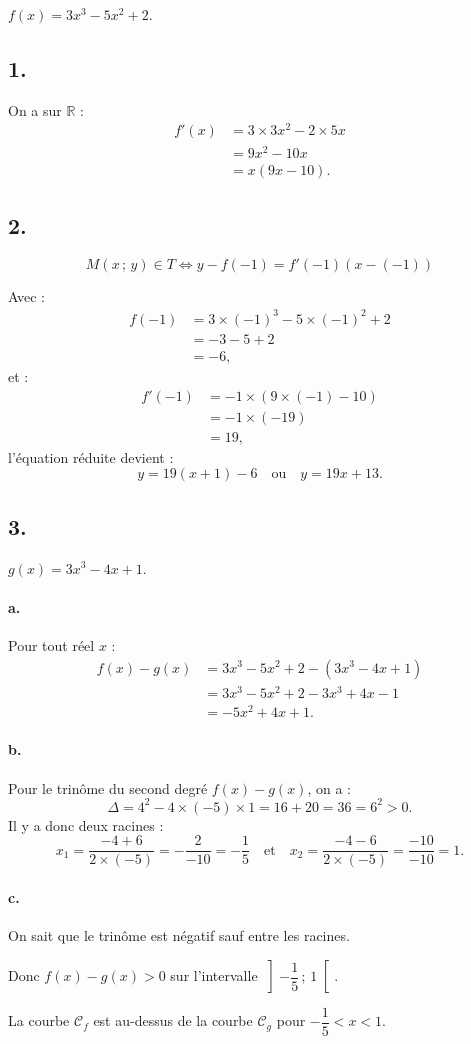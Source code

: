 \( f(x) = 3x^3 - 5x^2 + 2 \).

\subsection*{1.}

On a sur \( \mathbb{R} \) :
\begin{align*}
f'(x) &= 3 \times 3x^2 - 2 \times 5x \\
&= 9x^2 - 10x \\
&= x(9x - 10).
\end{align*}

\subsection*{2.}

\[
M(x \,;\, y) \in T \iff y - f(-1) = f'(-1)(x - (-1))
\]

Avec :
\begin{align*}
f(-1) &= 3 \times (-1)^3 - 5 \times (-1)^2 + 2 \\
&= -3 - 5 + 2 \\
&= -6, 
\end{align*}
et :
\begin{align*}
f'(-1) &= -1 \times (9 \times (-1) - 10) \\
&= -1 \times (-19) \\
&= 19,
\end{align*}
l'équation réduite devient :
\[
y = 19(x + 1) - 6 \quad \text{ou} \quad y = 19x + 13.
\]

\subsection*{3.}

\( g(x) = 3x^3 - 4x + 1 \).

\paragraph{a.} Pour tout réel \(x\) :
\begin{align*}
f(x) - g(x) &= 3x^3 - 5x^2 + 2 - (3x^3 - 4x + 1) \\
&= 3x^3 - 5x^2 + 2 - 3x^3 + 4x - 1 \\
&= -5x^2 + 4x + 1.
\end{align*}

\paragraph{b.} Pour le trinôme du second degré \( f(x) - g(x) \), on a :
\[
\Delta = 4^2 - 4 \times (-5) \times 1 = 16 + 20 = 36 = 6^2 > 0.
\]
Il y a donc deux racines :
\[
x_1 = \dfrac{-4 + 6}{2 \times (-5)} = -\dfrac{2}{-10} = -\dfrac{1}{5} \quad \text{et} \quad x_2  = \dfrac{-4 - 6}{2 \times (-5)} = \dfrac{-10}{-10} = 1.
\]

\paragraph{c.} On sait que le trinôme est négatif sauf entre les racines.

Donc \( f(x) - g(x) > 0\) sur l'intervalle \(\left]-\dfrac{1}{5}\,;\,1\right[\).

La courbe \( \mathcal{C}_f \) est au-dessus de la courbe \( \mathcal{C}_g \) pour \( -\dfrac{1}{5} < x < 1 \).
